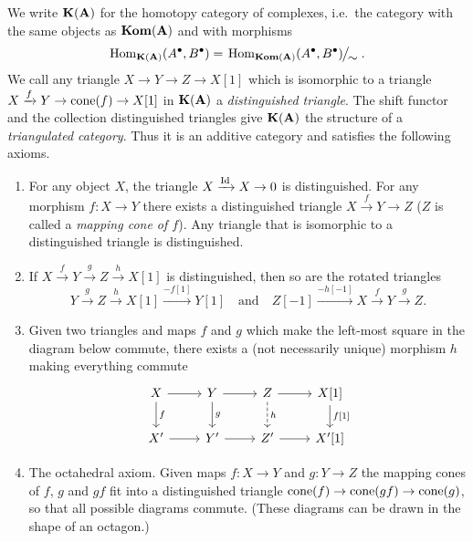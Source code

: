 \documentclass[number-in-sections,a4paper]{notes}
\begin{document}
We write $\mathbf{K}(\mathbf A)$ for the homotopy category of complexes, i.e.~the category with the same objects as $\mathbf{Kom}(\mathbf A)$ and with morphisms
\[
    \Hom_{\catHomotopy{\cat A}}(A^\bullet,B^\bullet) = \rquot{\Hom_{\catComplexes{\cat A}}(A^\bullet,B^\bullet)}{\sim}.
\]
We call any triangle $X \to Y \to Z \to X[1]$ which is isomorphic to a triangle $X \xrightarrow{f} Y \to \operatorname{cone}(f) \to X[1]$ in $\mathbf{K}(\mathbf A)$ a \emph{distinguished triangle}.
The shift functor and the collection distinguished triangles give $\mathbf{K}(\mathbf A)$ the structure of a \emph{triangulated category}.
Thus it is an additive category and satisfies the following axioms.

\begin{enumerate}[label=(\textsc{tr}$_\arabic*$)]
    \item\label{tr1}
        For any object $X$, the triangle $X \xrightarrow{{\mathrm{Id}_{}}} X \to 0$ is distinguished.
        For any morphism $f\colon X \to Y$ there exists a distinguished triangle $X \xrightarrow{f} Y \to Z$ ($Z$ is called a \emph{mapping cone of $f$}).
        Any triangle that is isomorphic to a distinguished triangle is distinguished.
    \item\label{tr2}
        If $X \xrightarrow{f} Y \xrightarrow{g} Z \xrightarrow{h} X[1]$ is distinguished, then so are the rotated triangles
        \[
            Y \xrightarrow{g} Z \xrightarrow{h} X[1] \xrightarrow{-f[1]} Y[1]
            \quad\text{and}\quad
            Z[-1] \xrightarrow{-h[-1]} X \xrightarrow{f} Y \xrightarrow{g} Z.
        \]
    \item\label{tr3}
        Given two triangles and maps $f$ and $g$ which make the left-most square in the diagram below commute, there exists a (not necessarily unique) morphism $h$ making everything commute
        \[
            \begin{tikzcd}
                X \arrow[r] \arrow[d, "f"] & Y \arrow[r] \arrow[d, "g"] & Z \arrow[r] \arrow[d, dashed, "h"] & X[1] \arrow[d, "{f[1]}"] \\
                X' \arrow[r] & Y' \arrow[r] & Z' \arrow[r] & X'[1]
            \end{tikzcd}
        \]
    \item\label{tr4} The octahedral axiom.
        Given maps $f\colon X \to Y$ and $g\colon Y \to Z$ the mapping cones of $f$, $g$ and $gf$ fit into a distinguished triangle $\operatorname{cone}(f) \to \operatorname{cone}(gf) \to \operatorname{cone}(g)$, so that all possible diagrams commute.
        (These diagrams can be drawn in the shape of an octagon.)
\end{enumerate}
\end{document}
